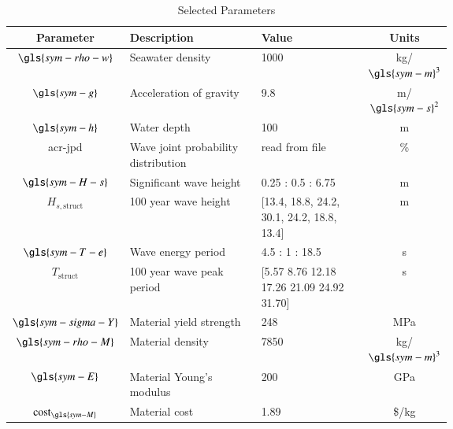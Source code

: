 \begin{table}[ht]
\centering
\caption{Selected Parameters}
\label{tab:parameters}
{\renewcommand{\arraystretch}{1.4}

\begin{tabular}{cP{0.35\linewidth}P{0.3\linewidth}c}
\textbf{Parameter} & \textbf{Description} & \textbf{Value} & \textbf{Units}  \\ \hline
$\gls{sym-rho-w}$ & Seawater density& 1000 & kg/$\gls{sym-m}^3$  \\ 
$\gls{sym-g}$& Acceleration of gravity& 9.8 & m/$\gls{sym-s}^2$  \\ 
$\gls{sym-h}$& Water depth & 100 & m  \\ 
\gls{acr-jpd}& Wave joint probability distribution & read from file \citep{janzou_sam_2022}  &\%  \\ 
$\gls{sym-H-s}$ & Significant wave height \citep{janzou_sam_2022}& 0.25 : 0.5 : 6.75  & m  \\ 
$H_{s,\text{struct}}$ & 100 year wave height \citep{berg_extreme_2011}& [13.4, 18.8, 24.2, 30.1, 24.2, 18.8, 13.4] & m  \\ 
$\gls{sym-T-e}$& Wave energy period \citep{janzou_sam_2022}& 4.5 : 1 : 18.5  & s  \\ 
$T_{\text{struct}}$ & 100 year wave peak period \citep{berg_extreme_2011}& [5.57 8.76 12.18 17.26 21.09 24.92 31.70] & s  \\ 
$\gls{sym-sigma-Y}$ & Material yield strength& 248 & MPa  \\ 
$\gls{sym-rho-M}$ & Material density& 7850 & kg/$\gls{sym-m}^3$  \\ 
$\gls{sym-E}$& Material Young's modulus& 200 & GPa  \\ 
$\text{cost}_{\gls{sym-M}}$ & Material cost& 1.89 & \$/kg \\ 

\end{tabular}}
\end{table}
